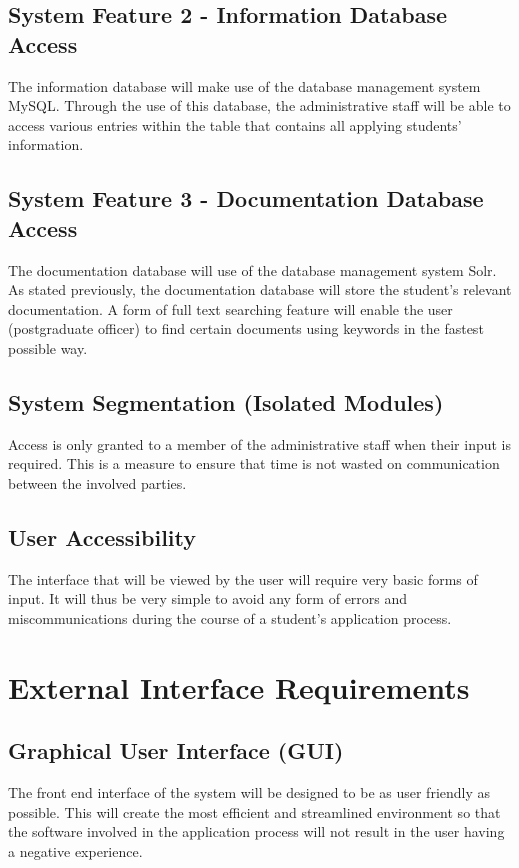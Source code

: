 \documentclass[journal,comsoc,onecolumn]{IEEEtran}
\begin{document}
\subsection{System Feature 2 - Information Database Access}
The information database will make use of the database management system MySQL. Through the use of this database, the administrative staff will be able to access various entries within the table that contains all applying students’ information.

\subsection{System Feature 3 - Documentation Database Access}

The documentation database will use of the database management system Solr. As stated previously, the documentation database will store the student’s relevant documentation. A form of full text searching feature will enable the user (postgraduate officer) to find certain documents using keywords in the fastest possible way.

\subsection{System Segmentation (Isolated Modules)}
Access is only granted to a member of the administrative staff when their input is required. This is a measure to ensure that time is not wasted on communication between the involved parties.

\subsection{User Accessibility}
The interface that will be viewed by the user will require very basic forms of input. It will thus be very simple to avoid any form of errors and miscommunications during the course of a student’s application process.

\section{External Interface Requirements}

\subsection{ Graphical User Interface (GUI)}
The front end interface of the system will be designed to be as user friendly as possible. This will create the most efficient and streamlined environment so that the software involved in the application process will not result in the user having a negative experience.
\end{document}
